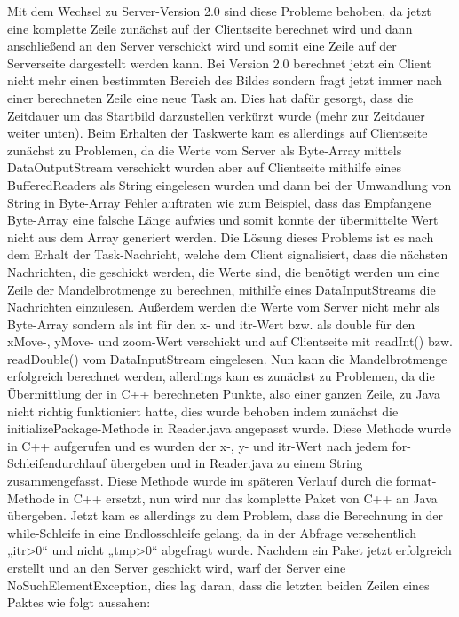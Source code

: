 \documentclass[12pt, onecolumn, notitlepage]{scrartcl}
\begin{document}
Mit dem Wechsel zu Server-Version 2.0 sind diese Probleme behoben, da jetzt eine komplette Zeile zunächst auf der Clientseite berechnet wird und dann anschließend an den Server verschickt wird und somit eine Zeile auf der Serverseite dargestellt werden kann. Bei Version 2.0 berechnet jetzt ein Client nicht mehr einen bestimmten Bereich des Bildes sondern fragt jetzt immer nach einer berechneten Zeile eine neue Task an. Dies hat dafür gesorgt, dass die Zeitdauer um das Startbild darzustellen verkürzt wurde (mehr zur Zeitdauer weiter unten). Beim Erhalten der Taskwerte kam es allerdings auf Clientseite zunächst zu Problemen, da die Werte vom Server als Byte-Array mittels DataOutputStream verschickt wurden aber auf Clientseite mithilfe eines BufferedReaders als String eingelesen wurden und dann bei der Umwandlung von String in Byte-Array Fehler auftraten wie zum Beispiel, dass das Empfangene Byte-Array eine falsche Länge aufwies und somit konnte der übermittelte Wert nicht aus dem Array generiert werden. Die Lösung dieses Problems ist es nach dem Erhalt der Task-Nachricht, welche dem Client signalisiert, dass die nächsten Nachrichten, die geschickt werden, die Werte sind, die benötigt werden um eine Zeile der Mandelbrotmenge zu berechnen, mithilfe eines DataInputStreams die Nachrichten einzulesen. Außerdem werden die Werte vom Server nicht mehr als Byte-Array sondern als int für den x- und itr-Wert bzw. als double für den xMove-, yMove- und zoom-Wert verschickt und auf Clientseite mit readInt() bzw. readDouble() vom DataInputStream eingelesen. Nun kann die Mandelbrotmenge erfolgreich berechnet werden, allerdings kam es zunächst zu Problemen, da die Übermittlung der in C++ berechneten Punkte, also einer ganzen Zeile, zu Java nicht richtig funktioniert hatte, dies wurde behoben indem zunächst die initializePackage-Methode in Reader.java angepasst wurde. Diese Methode wurde in C++ aufgerufen und es wurden der x-, y- und itr-Wert nach jedem for-Schleifendurchlauf übergeben und in Reader.java zu einem String zusammengefasst. Diese Methode wurde im späteren Verlauf durch die format-Methode in C++ ersetzt, nun wird nur das komplette Paket von C++ an Java übergeben. Jetzt kam es allerdings zu dem Problem, dass die Berechnung in der while-Schleife in eine Endlosschleife gelang, da in der Abfrage versehentlich „itr>0“ und nicht „tmp>0“ abgefragt wurde. Nachdem ein Paket jetzt erfolgreich erstellt und an den Server geschickt wird, warf der Server eine NoSuchElementException, dies lag daran, dass die letzten beiden Zeilen eines Paktes wie folgt aussahen: \\
\end{document}
